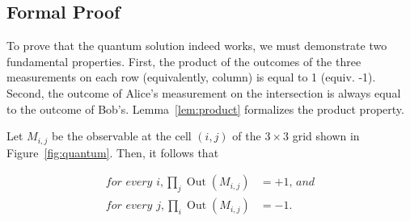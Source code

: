 \documentclass{llncs}
\begin{document}
\subsection{Formal Proof}\label{sec:msquare-proof}
To prove that the quantum solution indeed works, we must demonstrate
two fundamental properties. First, the product of the outcomes of the
three measurements on each row (equivalently, column) is equal to 1
(equiv. -1). Second, the outcome of Alice's measurement on the
intersection is always equal to the outcome of
Bob's. Lemma~\ref{lem:product} formalizes the product property.

\begin{lemma}
  \label{lem:product}
  Let \(M_{i, j}\) be the observable at the cell \((i, j)\) of the
  \(3 \times 3\) grid shown in Figure~\ref{fig:quantum}. Then,
  it follows that

  \begin{align}
    \textit{for every }i, \prod_{j} \operatorname{Out}(M_{i, j}) &= +1  \textit{, and} \\
    \textit{for every }j, \prod_{i} \operatorname{Out}(M_{i, j}) &= -1.
  \end{align}
\end{lemma}
\end{document}
